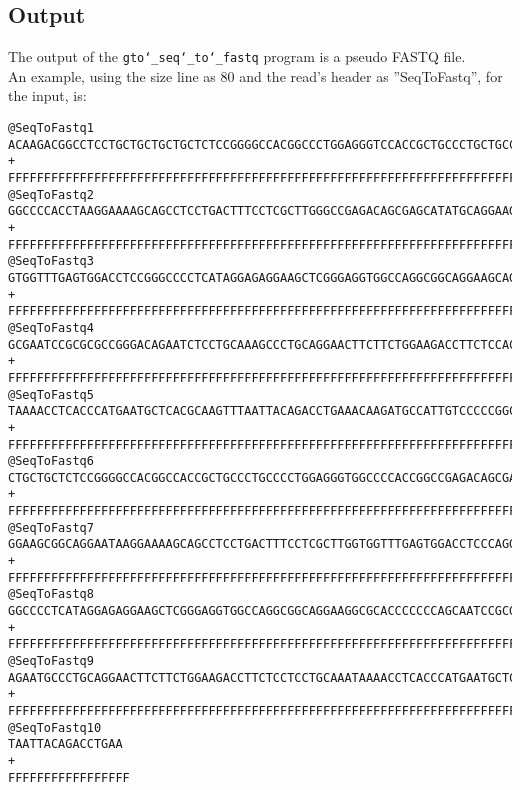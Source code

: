 \subsection*{Output}
The output of the \texttt{gto\char`_seq\char`_to\char`_fastq} program is a pseudo FASTQ file.\\
An example, using the size line as 80 and the read's header as ''SeqToFastq'', for the input, is:
\begin{lstlisting}
@SeqToFastq1
ACAAGACGGCCTCCTGCTGCTGCTGCTCTCCGGGGCCACGGCCCTGGAGGGTCCACCGCTGCCCTGCTGCCATTGTCCCC
+
FFFFFFFFFFFFFFFFFFFFFFFFFFFFFFFFFFFFFFFFFFFFFFFFFFFFFFFFFFFFFFFFFFFFFFFFFFFFFFFF
@SeqToFastq2
GGCCCCACCTAAGGAAAAGCAGCCTCCTGACTTTCCTCGCTTGGGCCGAGACAGCGAGCATATGCAGGAAGCGGCAGGAA
+
FFFFFFFFFFFFFFFFFFFFFFFFFFFFFFFFFFFFFFFFFFFFFFFFFFFFFFFFFFFFFFFFFFFFFFFFFFFFFFFF
@SeqToFastq3
GTGGTTTGAGTGGACCTCCGGGCCCCTCATAGGAGAGGAAGCTCGGGAGGTGGCCAGGCGGCAGGAAGCAGGCCAGTGCC
+
FFFFFFFFFFFFFFFFFFFFFFFFFFFFFFFFFFFFFFFFFFFFFFFFFFFFFFFFFFFFFFFFFFFFFFFFFFFFFFFF
@SeqToFastq4
GCGAATCCGCGCGCCGGGACAGAATCTCCTGCAAAGCCCTGCAGGAACTTCTTCTGGAAGACCTTCTCCACCCCCCCAGC
+
FFFFFFFFFFFFFFFFFFFFFFFFFFFFFFFFFFFFFFFFFFFFFFFFFFFFFFFFFFFFFFFFFFFFFFFFFFFFFFFF
@SeqToFastq5
TAAAACCTCACCCATGAATGCTCACGCAAGTTTAATTACAGACCTGAAACAAGATGCCATTGTCCCCCGGCCTCCTGCTG
+
FFFFFFFFFFFFFFFFFFFFFFFFFFFFFFFFFFFFFFFFFFFFFFFFFFFFFFFFFFFFFFFFFFFFFFFFFFFFFFFF
@SeqToFastq6
CTGCTGCTCTCCGGGGCCACGGCCACCGCTGCCCTGCCCCTGGAGGGTGGCCCCACCGGCCGAGACAGCGAGCATATGCA
+
FFFFFFFFFFFFFFFFFFFFFFFFFFFFFFFFFFFFFFFFFFFFFFFFFFFFFFFFFFFFFFFFFFFFFFFFFFFFFFFF
@SeqToFastq7
GGAAGCGGCAGGAATAAGGAAAAGCAGCCTCCTGACTTTCCTCGCTTGGTGGTTTGAGTGGACCTCCCAGGCCAGTGCCG
+
FFFFFFFFFFFFFFFFFFFFFFFFFFFFFFFFFFFFFFFFFFFFFFFFFFFFFFFFFFFFFFFFFFFFFFFFFFFFFFFF
@SeqToFastq8
GGCCCCTCATAGGAGAGGAAGCTCGGGAGGTGGCCAGGCGGCAGGAAGGCGCACCCCCCCAGCAATCCGCGCGCCGGGAC
+
FFFFFFFFFFFFFFFFFFFFFFFFFFFFFFFFFFFFFFFFFFFFFFFFFFFFFFFFFFFFFFFFFFFFFFFFFFFFFFFF
@SeqToFastq9
AGAATGCCCTGCAGGAACTTCTTCTGGAAGACCTTCTCCTCCTGCAAATAAAACCTCACCCATGAATGCTCACGCAAGTT
+
FFFFFFFFFFFFFFFFFFFFFFFFFFFFFFFFFFFFFFFFFFFFFFFFFFFFFFFFFFFFFFFFFFFFFFFFFFFFFFFF
@SeqToFastq10
TAATTACAGACCTGAA
+
FFFFFFFFFFFFFFFFF
\end{lstlisting}
